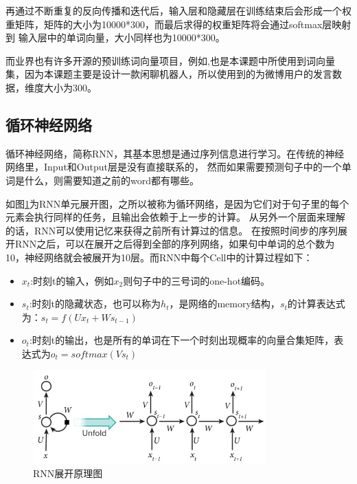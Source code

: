\documentclass[supercite]{HustGraduPaper}
\theoremstyle{definition}
\begin{document}
再通过不断重复的反向传播和迭代后，输入层和隐藏层在训练结束后会形成一个权重矩阵，矩阵的大小为10000*300，而最后求得的权重矩阵将会通过softmax层映射到
输入层中的单词向量，大小同样也为10000*300。

而业界也有许多开源的预训练词向量项目，例如\cite{wordvector},也是本课题中所使用到词向量集，因为本课题主要是设计一款闲聊机器人，所以使用到的为微博用户的发言数据，维度大小为300。


\subsection{循环神经网络}
循环神经网络，简称RNN\cite{mikolov2010recurrent}，其基本思想是通过序列信息进行学习。在传统的神经网络里，Input和Output层是没有直接联系的，
然而如果需要预测句子中的一个单词是什么，则需要知道之前的word都有哪些。

如图\ref{Fig.rnn}为RNN单元展开图，之所以被称为循环网络，是因为它们对于句子里的每个元素会执行同样的任务，且输出会依赖于上一步的计算。
从另外一个层面来理解的话，RNN可以使用记忆来获得之前所有计算过的信息。
在按照时间步的序列展开RNN之后，可以在展开之后得到全部的序列网络，如果句中单词的总个数为10，神经网络就会被展开为10层。而RNN中每个Cell中的计算过程如下：

\begin{itemize}
  \item $x_t$:时刻t的输入，例如$x_2$则句子中的三号词的one-hot编码。
  \item $s_t$:时刻t的隐藏状态，也可以称为$h_t$，是网络的memory结构，$s_t$的计算表达式为：$s_t=f(Ux_t + Ws_{t-1})$
  \item $o_t$:时刻t的输出，也是所有的单词在下一个时刻出现概率的向量合集矩阵，表达式为$o_t = softmax(Vs_t)$
\end{itemize}

\begin{figure}[htbp] %
  \centering %
  \includegraphics[width=0.8\textwidth]{images/rnn.png} %
  \caption{RNN展开原理图} %
  \label{Fig.rnn} %
\end{figure}
\end{document}
